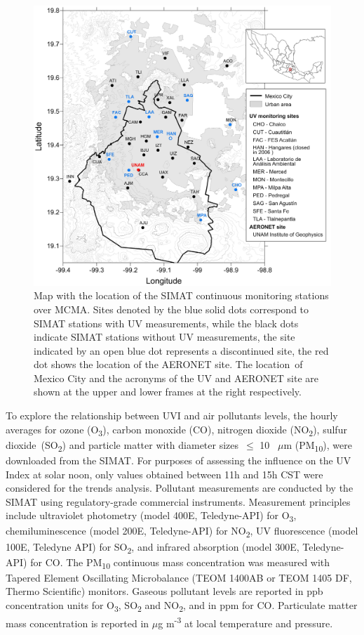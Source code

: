 \documentclass[journal=jacsat,manuscript=article]{achemso}
\begin{document}
\begin{figure}[H]
  \begin{center}
    \includegraphics[width=0.70\columnwidth]{figures/map}
    \caption{{Map with the location of the SIMAT continuous monitoring stations over
          MCMA. Sites denoted by the blue solid dots correspond to SIMAT stations
          with UV measurements, while the black dots indicate SIMAT stations
          without UV measurements, the site indicated by an open blue dot represents a
          discontinued site, the red dot shows the location of the
          AERONET site. The location~of Mexico City and the acronyms of the UV and
          AERONET site are shown at the upper and lower frames at the right
          respectively.
            {\label{fig:map}}%
        }}
  \end{center}
\end{figure}

To explore the relationship between UVI and air pollutants
levels, the hourly averages for ozone (O\textsubscript{3}), carbon
monoxide (CO), nitrogen dioxide (NO\textsubscript{2}), sulfur
dioxide~(SO\textsubscript{2}) and particle matter with diameter
sizes~\(\le\) 10 ~$\mu$m (PM\textsubscript{10}), were downloaded
from the SIMAT.\cite{pollutants_data} For purposes of assessing the
influence on the UV Index at solar noon, only values obtained between
11h and 15h CST were considered for the trends analysis. Pollutant
measurements are conducted by the SIMAT using regulatory-grade
commercial instruments. Measurement principles include ultraviolet
photometry (model 400E, Teledyne-API) for O\textsubscript{3},
chemiluminescence (model 200E, Teledyne-API) for NO\textsubscript{2}, UV
fluorescence (model 100E, Teledyne API) for SO\textsubscript{2}, and
infrared absorption (model 300E, Teledyne-API) for CO. The
PM\textsubscript{10} continuous mass concentration was measured with
Tapered Element Oscillating Microbalance (TEOM 1400AB or TEOM 1405 DF,
Thermo Scientific) monitors. Gaseous pollutant levels are reported in
ppb concentration units for O\textsubscript{3}, SO\textsubscript{2} and
NO\textsubscript{2}, and in ppm for CO. Particulate matter mass
concentration is reported in $\mu$g m\textsuperscript{-3} at local
temperature and pressure.
\end{document}
